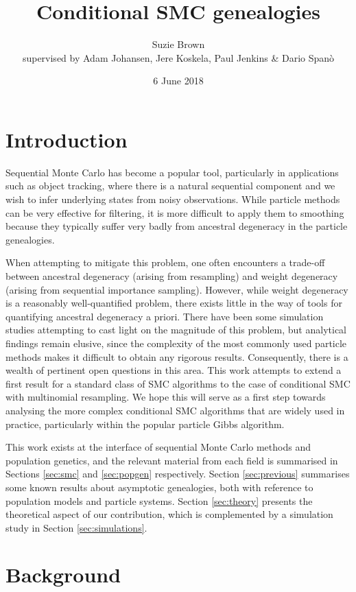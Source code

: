 \documentclass{article}
\title{Conditional SMC genealogies}
\author{Suzie Brown\\ {\small supervised by Adam Johansen, Jere Koskela, Paul Jenkins \& Dario Span\`o}}
\date{6 June 2018}
\begin{document}
\maketitle

\section{Introduction}
Sequential Monte Carlo has become a popular tool, particularly in applications such as object tracking, where there is a natural sequential component and we wish to infer underlying states from noisy observations.
While particle methods can be very effective for filtering, it is more difficult to apply them to smoothing because they typically suffer very badly from ancestral degeneracy in the particle genealogies.

When attempting to mitigate this problem, one often encounters a trade-off between ancestral degeneracy (arising from resampling) and weight degeneracy (arising from sequential importance sampling). However, while weight degeneracy is a reasonably well-quantified problem, there exists little in the way of tools for quantifying ancestral degeneracy a priori. There have been some simulation studies attempting to cast light on the magnitude of this problem, but analytical findings remain elusive, since the complexity of the most commonly used particle methods makes it difficult to obtain any rigorous results.
Consequently, there is a wealth of pertinent open questions in this area. This work attempts to extend a first result for a standard class of SMC algorithms to the case of conditional SMC with multinomial resampling. We hope this will serve as a first step towards analysing the more complex conditional SMC algorithms that are widely used in practice, particularly within the popular particle Gibbs algorithm.

This work exists at the interface of sequential Monte Carlo methods and population genetics, and the relevant material from each field is summarised in Sections \ref{sec:smc} and \ref{sec:popgen} respectively. 
Section \ref{sec:previous} summarises some known results about asymptotic genealogies, both with reference to population models and particle systems.
Section \ref{sec:theory} presents the theoretical aspect of our contribution, which is complemented by a simulation study in Section \ref{sec:simulations}.

\section{Background}
\end{document}
